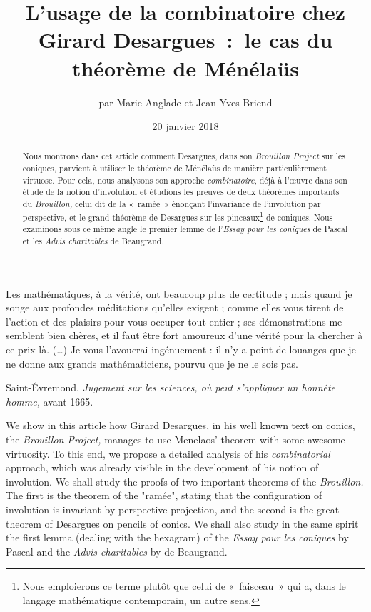 \documentclass[12pt, a4paper]{article}
\title{L'usage de la combinatoire chez Girard Desargues~:~le cas du théorème de Ménélaüs}
\author{par %
Marie Anglade et Jean-Yves Briend
}
\date{20 janvier 2018}
\begin{document}
\maketitle

\setlength{\epigraphwidth}{9cm}
\epigraph{Les mathématiques, à la vérité, ont beaucoup plus de certitude ; mais quand je songe aux profondes méditations qu'elles exigent ; comme elles vous tirent de l'action et des plaisirs pour vous occuper tout entier ; ses démonstrations me semblent bien chères, et il faut être fort amoureux d'une vérité pour la chercher à ce prix là. (\ldots) Je vous l'avouerai ingénuement : il n'y a point de louanges que je ne donne aux grands mathématiciens, pourvu que je ne le sois pas.}{Saint-Évremond, \textit{Jugement sur les sciences, où peut s'appliquer un honnête homme,}  avant 1665.}


\begin{abstract} Nous montrons dans cet article comment Desargues, dans son \textit{Brouillon Project} sur les coniques,  parvient à utiliser le théorème de Ménélaüs de manière parti\-cu\-lièrement virtuose. Pour cela, nous analysons son approche \textit{combinatoire}, déjà à l'œuvre dans son étude de la notion d'involution et étudions les preuves de deux théorèmes importants du \textit{Brouillon,} celui dit de la «~ramée~» énonçant l'invariance de l'involution par perspective, et le grand théorème de Desargues sur les pinceaux\footnote{Nous emploierons ce terme plutôt que celui de «~faisceau~» qui a, dans le langage mathématique contemporain, un autre sens.} de coniques. Nous examinons sous ce même angle le premier lemme de l'\textit{Essay pour les coniques} de Pascal et les \textit{Advis charitables} de Beaugrand.
\end{abstract}

 We show in this article how Girard Desargues, in his well known text on conics, the \textit{Brouillon Project,} manages to use Menelaos' theorem with some awesome virtuosity. To this end, we propose a detailed analysis of his \textit{combinatorial} approach, which was already visible in the development of his notion of involution. We shall study  the proofs of two important theorems of the \textit{Brouillon.} The first is the theorem of the "ramée", stating that the configuration of involution is invariant by perspective projection, and the second is the great theorem of Desargues on pencils of conics. We shall also study in the same spirit the first lemma (dealing with the hexagram) of the \textit{Essay pour les coniques} by Pascal and the \textit{Advis charitables} by de Beaugrand.
\end{document}
